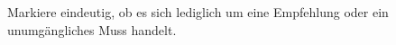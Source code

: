 \documentclass[a4paper,titlepage=true,twoside]{scrartcl}
\newcommand{\PreserveBackslash}[1]{\let\temp=\\#1\let\\=\temp}
\begin{document}
Markiere eindeutig, ob es sich lediglich um eine Empfehlung oder ein
unumgängliches Muss handelt.

\end{document}
